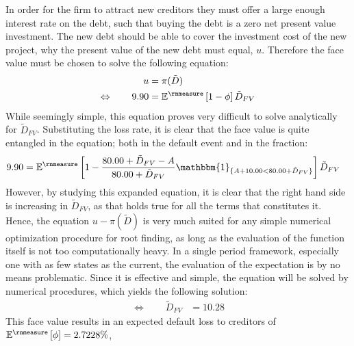 \documentclass[main.tex]{subfiles}
\begin{document}
        In order for the firm to attract new creditors they must offer a large enough interest rate on the debt, 
        such that buying the debt is a zero net present value investment.
        The new debt should be able to cover the investment cost of the new project,
        why the present value of the new debt must equal, $u$.
        Therefore the face value must be chosen to solve the following equation:
            \begin{align}
                u &= \pi(\tilde{D}) \\
                \Leftrightarrow  \qquad
                9.90 &= \mathbb{E}^{\rnmeasure}\left[1 - \phi\right] \tilde{D}_{FV}
            \end{align}
        While seemingly simple, this equation proves very difficult to solve analytically for $\tilde{D}_{FV}$.
        Substituting the loss rate, it is clear that the face value is quite entangled in the equation;
        both in the default event and in the fraction:
            \begin{align}
                9.90
                &= 
                \mathbb{E}^{\rnmeasure}\left[
                    1 
                    - 
                    \frac{
                        80.00 + \tilde{D}_{FV} - A
                    }{
                        80.00 + \tilde{D}_{FV}
                    }
                    \mathbbm{1}_{\{A + 10.00 < 80.00 + \tilde{D}_{FV}\}} 
                \right] 
                \tilde{D}_{FV} 
            \end{align}
        However, by studying this expanded equation, it is clear that the right hand side 
        is increasing in $\tilde{D}_{FV}$, as that holds true for all the terms that constitutes it.
        Hence, the equation $u - \pi(\tilde{D})$ is very much suited for any simple numerical optimization procedure
        for root finding, as long as the evaluation of the function itself is not too computationally heavy.
        In a single period framework, especially one with as few states as the current,
        the evaluation of the expectation is by no means problematic.
        Since it is effective and simple, the equation will be solved by numerical procedures, 
        which yields the following solution:
            \begin{align}
                \Leftrightarrow  \qquad
                \tilde{D}_{FV} &= 10.28
            \end{align}
        This face value results in an expected default loss to creditors of 
        $\mathbb{E}^{\rnmeasure}\left[\phi\right] = 2.7228\%$,
\end{document}
